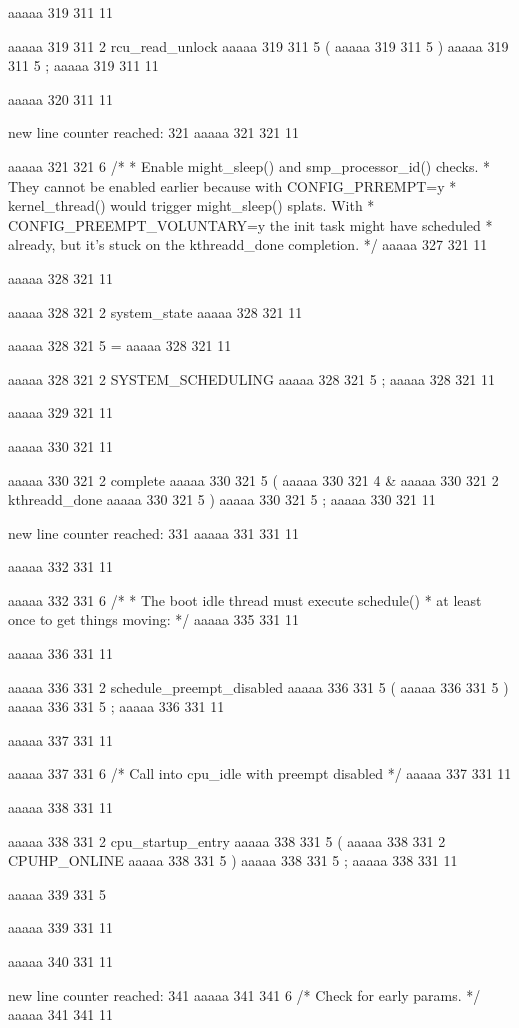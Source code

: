 {aaaaa 319 311
11
	
aaaaa 319 311
2
rcu_read_unlock
aaaaa 319 311
5
(
aaaaa 319 311
5
)
aaaaa 319 311
5
;
aaaaa 319 311
11


aaaaa 320 311
11


new line counter reached: 321
aaaaa 321 321
11
	
aaaaa 321 321
6
/*
	 * Enable might_sleep() and smp_processor_id() checks.
	 * They cannot be enabled earlier because with CONFIG_PRREMPT=y
	 * kernel_thread() would trigger might_sleep() splats. With
	 * CONFIG_PREEMPT_VOLUNTARY=y the init task might have scheduled
	 * already, but it's stuck on the kthreadd_done completion.
	 */
aaaaa 327 321
11


aaaaa 328 321
11
	
aaaaa 328 321
2
system_state
aaaaa 328 321
11
 
aaaaa 328 321
5
=
aaaaa 328 321
11
 
aaaaa 328 321
2
SYSTEM_SCHEDULING
aaaaa 328 321
5
;
aaaaa 328 321
11


aaaaa 329 321
11


aaaaa 330 321
11
	
aaaaa 330 321
2
complete
aaaaa 330 321
5
(
aaaaa 330 321
4
&
aaaaa 330 321
2
kthreadd_done
aaaaa 330 321
5
)
aaaaa 330 321
5
;
aaaaa 330 321
11


new line counter reached: 331
aaaaa 331 331
11


aaaaa 332 331
11
	
aaaaa 332 331
6
/*
	 * The boot idle thread must execute schedule()
	 * at least once to get things moving:
	 */
aaaaa 335 331
11


aaaaa 336 331
11
	
aaaaa 336 331
2
schedule_preempt_disabled
aaaaa 336 331
5
(
aaaaa 336 331
5
)
aaaaa 336 331
5
;
aaaaa 336 331
11


aaaaa 337 331
11
	
aaaaa 337 331
6
/* Call into cpu_idle with preempt disabled */
aaaaa 337 331
11


aaaaa 338 331
11
	
aaaaa 338 331
2
cpu_startup_entry
aaaaa 338 331
5
(
aaaaa 338 331
2
CPUHP_ONLINE
aaaaa 338 331
5
)
aaaaa 338 331
5
;
aaaaa 338 331
11


aaaaa 339 331
5
}
aaaaa 339 331
11


aaaaa 340 331
11


new line counter reached: 341
aaaaa 341 341
6
/* Check for early params. */
aaaaa 341 341
11


